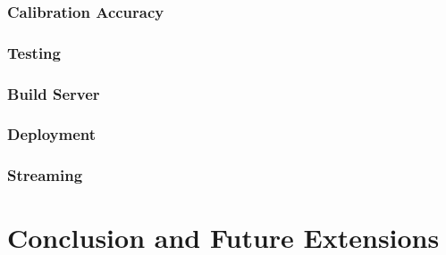\documentclass{article}
\begin{document}
\subsubsection{Calibration Accuracy}
\subsubsection{Testing}
\subsubsection{Build Server}
\subsubsection{Deployment} %
\subsubsection{Streaming}

\newpage
\section{Conclusion and Future Extensions}
\end{document}
